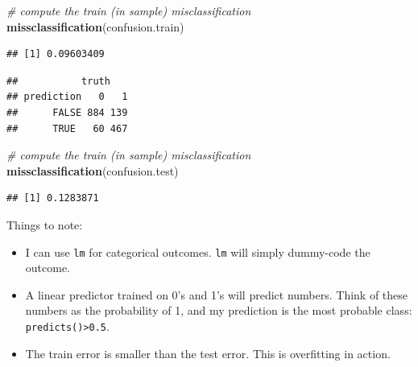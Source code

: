 \documentclass[]{book}
\newenvironment{Shaded}{\begin{snugshade}}{\end{snugshade}}
\newcommand{\CommentTok}[1]{\textcolor[rgb]{0.56,0.35,0.01}{\textit{#1}}}
\newcommand{\DataTypeTok}[1]{\textcolor[rgb]{0.13,0.29,0.53}{#1}}
\newcommand{\FloatTok}[1]{\textcolor[rgb]{0.00,0.00,0.81}{#1}}
\newcommand{\KeywordTok}[1]{\textcolor[rgb]{0.13,0.29,0.53}{\textbf{#1}}}
\newcommand{\NormalTok}[1]{#1}
\newcommand{\OperatorTok}[1]{\textcolor[rgb]{0.81,0.36,0.00}{\textbf{#1}}}
\newcommand{\StringTok}[1]{\textcolor[rgb]{0.31,0.60,0.02}{#1}}
\providecommand{\tightlist}{%
  \setlength{\itemsep}{0pt}\setlength{\parskip}{0pt}}
\theoremstyle{definition}
\theoremstyle{definition}
\theoremstyle{definition}
\theoremstyle{remark}
\begin{document}
\begin{Shaded}
\begin{Highlighting}[]
\CommentTok{# compute the train (in sample) misclassification}
\KeywordTok{missclassification}\NormalTok{(confusion.train) }
\end{Highlighting}
\end{Shaded}

\begin{verbatim}
## [1] 0.09603409
\end{verbatim}

\begin{Shaded}
\end{Shaded}

\begin{verbatim}
##           truth
## prediction   0   1
##      FALSE 884 139
##      TRUE   60 467
\end{verbatim}

\begin{Shaded}
\begin{Highlighting}[]
\CommentTok{# compute the train (in sample) misclassification}
\KeywordTok{missclassification}\NormalTok{(confusion.test)}
\end{Highlighting}
\end{Shaded}

\begin{verbatim}
## [1] 0.1283871
\end{verbatim}

Things to note:

\begin{itemize}
\tightlist
\item
  I can use \texttt{lm} for categorical outcomes. \texttt{lm} will simply dummy-code the outcome.
\item
  A linear predictor trained on 0's and 1's will predict numbers. Think of these numbers as the probability of 1, and my prediction is the most probable class: \texttt{predicts()\textgreater{}0.5}.
\item
  The train error is smaller than the test error. This is overfitting in action.
\end{itemize}
\end{document}
